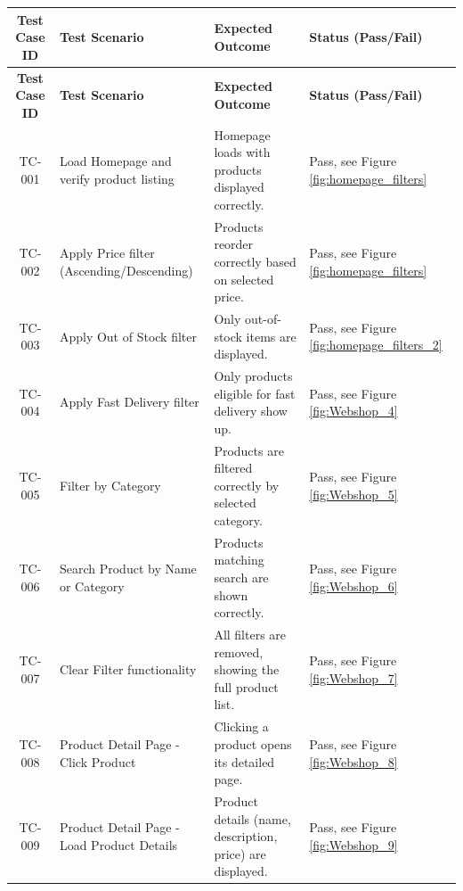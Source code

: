 \documentclass{llncs}
\begin{document}
\renewcommand{\arraystretch}{1.3}
\begin{longtable}{|c|>{\raggedright}p{4.8cm}|p{6cm}|>{\centering\arraybackslash}p{2cm}|}
    \hline
    \textbf{Test Case ID} & \textbf{Test Scenario}                     & \textbf{Expected Outcome}                                 & \textbf{Status (Pass/Fail)}            \\ \hline
    \endfirsthead
    \hline
    \textbf{Test Case ID} & \textbf{Test Scenario}                     & \textbf{Expected Outcome}                                 & \textbf{Status (Pass/Fail)}            \\ \hline
    \endhead
    TC-001                & Load Homepage and verify product listing   & Homepage loads with products displayed correctly.         & Pass, see Figure \ref{fig:homepage_filters}   \\ \hline
    TC-002                & Apply Price filter (Ascending/Descending)  & Products reorder correctly based on selected price.       & Pass, see Figure \ref{fig:homepage_filters}   \\ \hline
    TC-003                & Apply Out of Stock filter                  & Only out-of-stock items are displayed.                    & Pass, see Figure \ref{fig:homepage_filters_2} \\ \hline
    TC-004                & Apply Fast Delivery filter                 & Only products eligible for fast delivery show up.         & Pass, see Figure \ref{fig:Webshop_4}          \\ \hline
    TC-005                & Filter by Category                         & Products are filtered correctly by selected category.     & Pass, see Figure \ref{fig:Webshop_5}          \\ \hline
    TC-006                & Search Product by Name or Category         & Products matching search are shown correctly.             & Pass, see Figure \ref{fig:Webshop_6}          \\ \hline
    TC-007                & Clear Filter functionality                 & All filters are removed, showing the full product list.   & Pass, see Figure \ref{fig:Webshop_7}          \\ \hline
    TC-008                & Product Detail Page - Click Product        & Clicking a product opens its detailed page.               & Pass, see Figure \ref{fig:Webshop_8}          \\ \hline
    TC-009                & Product Detail Page - Load Product Details & Product details (name, description, price) are displayed. & Pass, see Figure \ref{fig:Webshop_9}          \\ \hline

\end{longtable}
\end{document}
